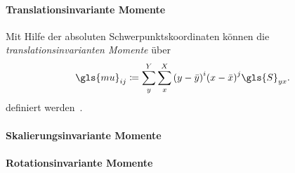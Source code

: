 \paragraph{Translationsinvariante Momente}
\label{translationsinvariante_momente}

Mit Hilfe der absoluten Schwerpunktskoordinaten können die \emph{translationsinvarianten Momente} über
\begin{equation*}
  \gls{mu}_{ij} \coloneqq \sum_y^Y \sum_x^X {\left(y - \bar{y}\right)}^i {\left(x - \bar{x}\right)}^j \gls{S}_{yx}.
\end{equation*}
definiert werden~\cite{momente}.

\paragraph{Skalierungsinvariante Momente}
\label{skalierungsinvariante_zentrierte_momente}

\paragraph{Rotationsinvariante Momente}
\label{rotationsinvariante_momente}




\cite{Siedhoff}
